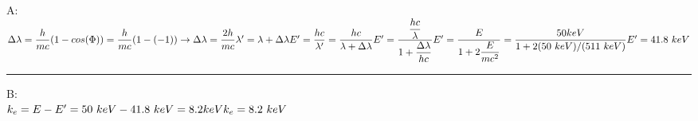 \documentclass[fleqn]{article}
\begin{document}
\begin{enumerate}
      \textcolor{hwColor}{
        A: \\
        $
          \Delta \lambda=\dfrac{h}{mc}(1-cos(\Phi))=\dfrac{h}{mc}(1-(-1)) \rightarrow \Delta \lambda=\dfrac{2h}{mc} \\
          \\
          \lambda^\prime =\lambda+\Delta \lambda \\
          \\
          E^\prime=\dfrac{hc}{\lambda^\prime}=\dfrac{hc}{\lambda + \Delta \lambda} \\
          \\
          E^\prime =\dfrac{\dfrac{hc}{\lambda}}{1+\dfrac{\Delta \lambda}{hc}} \\
          \\
          E^\prime=\dfrac{E}{1+2\dfrac{E}{mc^2}}=\dfrac{50 keV}{1+2(50 ~ keV)/(511 ~ keV)} \\
          \\
          E^\prime=41.8 ~ keV
        $
      }

      \textcolor{hwColor}{   
        \rule{15cm}{0.4pt}   
      }

      \textcolor{hwColor}{
        B: \\
        $
          k_e=E-E^\prime=50 ~ keV-41.8 ~ keV=8.2 keV \\
          \\
          k_e=8.2 ~ keV
        $
      }

  \end{enumerate}
  
\end{document}
